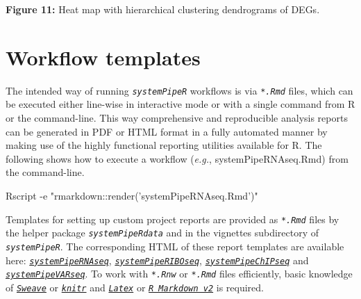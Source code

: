 \documentclass[14pt,]{article}
\newcommand{\hlstr}[1]{\textcolor[rgb]{0.251,0.627,0.251}{#1}}%
\newcommand{\hlstd}[1]{\textcolor[rgb]{0.251,0.251,0.251}{#1}}%
\newenvironment{Shaded}{\begin{myshaded}}{\end{myshaded}}
\newcommand{\StringTok}[1]{\hlstr{#1}}
\newcommand{\ExtensionTok}[1]{{#1}}
\newcommand{\NormalTok}[1]{\hlstd{#1}}
\begin{document}
\textbf{Figure 11:} Heat map with hierarchical clustering dendrograms of DEGs.

\hypertarget{workflow-templates}{%
\section{Workflow templates}\label{workflow-templates}}

The intended way of running \emph{\texttt{systemPipeR}} workflows is via \emph{\texttt{*.Rmd}} files, which
can be executed either line-wise in interactive mode or with a single command from
R or the command-line. This way comprehensive and reproducible analysis reports
can be generated in PDF or HTML format in a fully automated manner by making use
of the highly functional reporting utilities available for R.
The following shows how to execute a workflow (\emph{e.g.}, systemPipeRNAseq.Rmd)
from the command-line.

\begin{Shaded}
\begin{Highlighting}[]
\ExtensionTok{Rscript}\NormalTok{ -e }\StringTok{"rmarkdown::render('systemPipeRNAseq.Rmd')"}
\end{Highlighting}
\end{Shaded}

Templates for setting up custom project reports are provided as \emph{\texttt{*.Rmd}} files by the helper package \emph{\texttt{systemPipeRdata}} and in the vignettes subdirectory of \emph{\texttt{systemPipeR}}. The corresponding HTML of these report templates are available here: \href{http://www.bioconductor.org/packages/devel/data/experiment/vignettes/systemPipeRdata/inst/doc/systemPipeRNAseq.html}{\emph{\texttt{systemPipeRNAseq}}}, \href{http://www.bioconductor.org/packages/devel/data/experiment/vignettes/systemPipeRdata/inst/doc/systemPipeRIBOseq.html}{\emph{\texttt{systemPipeRIBOseq}}}, \href{http://www.bioconductor.org/packages/devel/data/experiment/vignettes/systemPipeRdata/inst/doc/systemPipeChIPseq.html}{\emph{\texttt{systemPipeChIPseq}}} and \href{http://www.bioconductor.org/packages/devel/data/experiment/vignettes/systemPipeRdata/inst/doc/systemPipeVARseq.html}{\emph{\texttt{systemPipeVARseq}}}. To work with \emph{\texttt{*.Rnw}} or \emph{\texttt{*.Rmd}} files efficiently, basic knowledge of \href{https://www.stat.uni-muenchen.de/~leisch/Sweave/}{\emph{\texttt{Sweave}}} or \href{http://yihui.name/knitr/}{\emph{\texttt{knitr}}} and \href{http://www.latex-project.org/}{\emph{\texttt{Latex}}} or \href{http://rmarkdown.rstudio.com/}{\emph{\texttt{R Markdown v2}}} is required.
\end{document}
